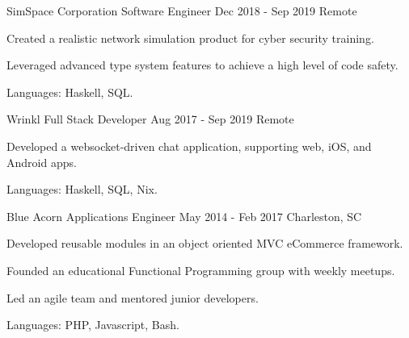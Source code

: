 

\begin{cventries}

  \cventry
    {SimSpace Corporation}
    {Software Engineer}
    {Dec 2018 - Sep 2019}
    {Remote}
    {
      \begin{cvitems}
        \item Created a realistic network simulation product for cyber security
          training.
        \item Leveraged advanced type system features to achieve a high level of
          code safety.
        \item Languages: Haskell, SQL.
      \end{cvitems}
    }


  \cventry
    {Wrinkl}
    {Full Stack Developer}
    {Aug 2017 - Sep 2019}
    {Remote}
    {
      \begin{cvitems}
        \item Developed a websocket-driven chat application, supporting
          web, iOS, and Android apps.
        \item Languages: Haskell, SQL, Nix.
      \end{cvitems}
    }


  \cventry
    {Blue Acorn} %
    {Applications Engineer} %
    {May 2014 - Feb 2017} %
    {Charleston, SC} %
    {
      \begin{cvitems} %
        \item {Developed reusable modules in an object oriented MVC eCommerce framework.}
        \item {Founded an educational Functional Programming group with weekly meetups.}
        \item {Led an agile team and mentored junior developers.}
        \item {Languages: PHP, Javascript, Bash.}
      \end{cvitems}
    }

\end{cventries}
